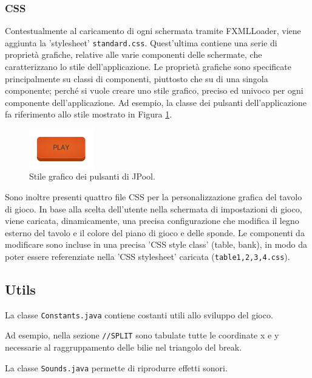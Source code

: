 \documentclass[12pt,a4paper]{report}
\begin{document}
\subsubsection*{CSS}
Contestualmente al caricamento di ogni schermata tramite FXMLLoader, viene aggiunta la 'stylesheet' \texttt{standard.css}.
Quest'ultima contiene una serie di proprietà grafiche, relative alle varie componenti delle schermate, che caratterizzano lo stile dell'applicazione.
Le proprietà grafiche sono specificate principalmente su classi di componenti, piuttosto che su di una singola componente; perché si vuole creare uno stile grafico, preciso ed univoco per ogni componente dell'applicazione.
Ad esempio, la classe dei pulsanti dell'applicazione fa riferimento allo stile mostrato in Figura \ref{fig:ButtonStyle}.

\begin{figure}
    \centering
    \includegraphics[width=0.25\textwidth]{ButtonStyle.png}
    \caption{Stile grafico dei pulsanti di JPool.}
    \label{fig:ButtonStyle}
\end{figure}

Sono inoltre presenti quattro file CSS per la personalizzazione grafica del tavolo di gioco.
In base alla scelta dell'utente nella schermata di impostazioni di gioco, viene caricata, dinamicamente, una precisa configurazione che modifica il legno esterno del tavolo e il colore del piano di gioco e delle sponde.
Le componenti da modificare sono incluse in una precisa 'CSS style class' (table, bank), in modo da poter essere referenziate nella 'CSS stylesheet' caricata (\texttt{table1,2,3,4.css}).

\subsection{Utils}\label{se:Utils} %
La classe \texttt{Constants.java} contiene costanti utili allo sviluppo del gioco.

Ad esempio, nella sezione \texttt{//SPLIT} sono tabulate tutte le coordinate x e y necessarie al raggruppamento delle bilie nel triangolo del break.

\vspace{3mm}

La classe \texttt{Sounds.java} permette di riprodurre effetti sonori.
\end{document}
